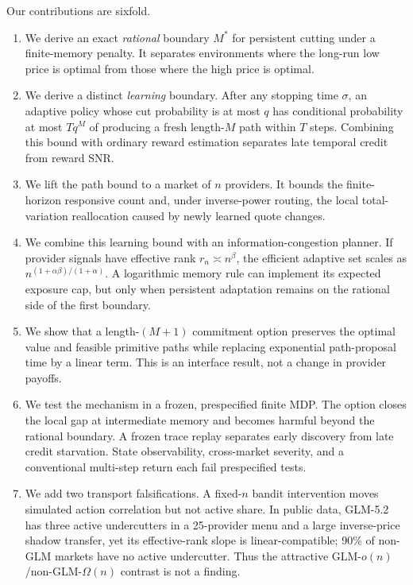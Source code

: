 \documentclass[10pt,twocolumn]{article}
\begin{document}
Our contributions are sixfold.
\begin{enumerate}
  \item We derive an exact \emph{rational} boundary $M^*$ for persistent
  cutting under a finite-memory penalty.  It separates environments where the
  long-run low price is optimal from those where the high price is optimal.
  \item We derive a distinct \emph{learning} boundary.  After any stopping
  time $\sigma$, an adaptive policy whose cut probability is at most $q$ has
  conditional probability at most $Tq^M$ of producing a fresh length-$M$ path
  within $T$ steps.  Combining this bound with ordinary reward estimation
  separates late temporal credit from reward SNR.
  \item We lift the path bound to a market of $n$ providers.  It bounds the
  finite-horizon responsive count and, under inverse-power routing, the local
  total-variation reallocation caused by newly learned quote changes.
  \item We combine this learning bound with an information-congestion planner.
  If provider signals have effective rank $r_n\asymp n^\beta$, the efficient
  adaptive set scales as
  $n^{(1+\alpha\beta)/(1+\alpha)}$.  A logarithmic memory rule can implement
  its expected exposure cap, but only when persistent adaptation remains on
  the rational side of the first boundary.
  \item We show that a length-$(M+1)$ commitment option preserves the optimal
  value and feasible primitive paths while replacing exponential path-proposal
  time by a linear term.  This is an interface result, not a change in provider
  payoffs.
  \item We test the mechanism in a frozen, prespecified finite MDP.  The option
  closes the local gap at intermediate memory and becomes harmful beyond the
  rational boundary.  A frozen trace replay separates early discovery from late
  credit starvation.  State observability, cross-market severity, and a
  conventional multi-step return each fail prespecified tests.
  \item We add two transport falsifications.  A fixed-$n$ bandit intervention
  moves simulated action correlation but not active share.  In public data,
  GLM-5.2 has three active undercutters in a 25-provider menu and a large
  inverse-price shadow transfer, yet its effective-rank slope is
  linear-compatible; 90\% of non-GLM markets have no active undercutter.  Thus
  the attractive GLM-$o(n)$/non-GLM-$\Omega(n)$ contrast is not a finding.
\end{enumerate}
\end{document}
